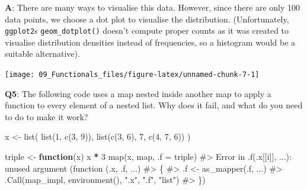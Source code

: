 \documentclass[
]{krantz}
\makeatletter
\newenvironment{Shaded}{\begin{snugshade}}{\end{snugshade}}
\newcommand{\CommentTok}[1]{\textcolor[rgb]{0.56,0.35,0.01}{\textit{#1}}}
\newcommand{\ControlFlowTok}[1]{\textcolor[rgb]{0.13,0.29,0.53}{\textbf{#1}}}
\newcommand{\DataTypeTok}[1]{\textcolor[rgb]{0.13,0.29,0.53}{#1}}
\newcommand{\DecValTok}[1]{\textcolor[rgb]{0.00,0.00,0.81}{#1}}
\newcommand{\FloatTok}[1]{\textcolor[rgb]{0.00,0.00,0.81}{#1}}
\newcommand{\KeywordTok}[1]{\textcolor[rgb]{0.13,0.29,0.53}{\textbf{#1}}}
\newcommand{\NormalTok}[1]{#1}
\newcommand{\OperatorTok}[1]{\textcolor[rgb]{0.81,0.36,0.00}{\textbf{#1}}}
\newcommand{\StringTok}[1]{\textcolor[rgb]{0.31,0.60,0.02}{#1}}
\newenvironment{kframe}{%
\medskip{}
\setlength{\fboxsep}{.8em}
 \def\at@end@of@kframe{}%
 \ifinner\ifhmode%
  \def\at@end@of@kframe{\end{minipage}}%
  \begin{minipage}{\columnwidth}%
 \fi\fi%
 \def\FrameCommand##1{\hskip\@totalleftmargin \hskip-\fboxsep
 \colorbox{shadecolor}{##1}\hskip-\fboxsep
     \hskip-\linewidth \hskip-\@totalleftmargin \hskip\columnwidth}%
 \MakeFramed {\advance\hsize-\width
   \@totalleftmargin\z@ \linewidth\hsize
   \@setminipage}}%
 {\par\unskip\endMakeFramed%
 \at@end@of@kframe}
\renewenvironment{Shaded}{\begin{kframe}}{\end{kframe}}
\renewcommand{\KeywordTok} [1]{\textcolor[rgb]{0.00,0.44,0.13}{{#1}}}
\renewcommand{\DataTypeTok}[1]{\textcolor[rgb]{0.56,0.13,0.00}{{#1}}}
\renewcommand{\DecValTok}  [1]{\textcolor[rgb]{0.25,0.63,0.44}{{#1}}}
\renewcommand{\FloatTok}   [1]{\textcolor[rgb]{0.25,0.63,0.44}{{#1}}}
\renewcommand{\StringTok}  [1]{\textcolor[rgb]{0.25,0.44,0.63}{{#1}}}
\renewcommand{\CommentTok} [1]{\textcolor[rgb]{0.38,0.63,0.69}{{#1}}}
\renewcommand{\NormalTok}  [1]{{#1}}
\makeatother
\begin{document}
\textbf{{A}}: There are many ways to visualise this data. However, since there are only 100 data points, we choose a dot plot to visualise the distribution. (Unfortunately, \texttt{ggplot2}s \texttt{geom\_dotplot()} doesn't compute proper counts as it was created to visualise distribution densities instead of frequencies, so a histogram would be a suitable alternative).

\begin{Shaded}
\end{Shaded}

\begin{center}\texttt{[image: 09\_Functionals\_files/figure-latex/unnamed-chunk-7-1]} \end{center}

\textbf{{Q5}}: The following code uses a map nested inside another map to apply a function to every element of a nested list. Why does it fail, and what do you need to do to make it work?

\begin{Shaded}
\begin{Highlighting}[]
\NormalTok{x <-}\StringTok{ }\KeywordTok{list}\NormalTok{(}
  \KeywordTok{list}\NormalTok{(}\DecValTok{1}\NormalTok{, }\KeywordTok{c}\NormalTok{(}\DecValTok{3}\NormalTok{, }\DecValTok{9}\NormalTok{)),}
  \KeywordTok{list}\NormalTok{(}\KeywordTok{c}\NormalTok{(}\DecValTok{3}\NormalTok{, }\DecValTok{6}\NormalTok{), }\DecValTok{7}\NormalTok{, }\KeywordTok{c}\NormalTok{(}\DecValTok{4}\NormalTok{, }\DecValTok{7}\NormalTok{, }\DecValTok{6}\NormalTok{))}
\NormalTok{)}

\NormalTok{triple <-}\StringTok{ }\ControlFlowTok{function}\NormalTok{(x) x }\OperatorTok{*}\StringTok{ }\DecValTok{3}
\KeywordTok{map}\NormalTok{(x, map, }\DataTypeTok{.f =}\NormalTok{ triple)}
\CommentTok{#> Error in .f(.x[[i]], ...): unused argument (function (.x, .f, ...)}
\CommentTok{#> \{}
\CommentTok{#> .f <- as_mapper(.f, ...)}
\CommentTok{#> .Call(map_impl, environment(), ".x", ".f", "list")}
\CommentTok{#> \})}
\end{Highlighting}
\end{Shaded}
\end{document}
